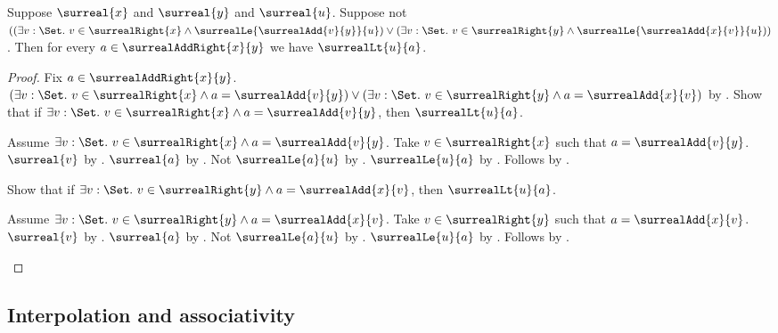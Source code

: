 \begin{lemma}\label{surreal_add_right_above_without_interpolant}
    Suppose $\surreal{x}$ and $\surreal{y}$ and $\surreal{u}$.
    Suppose not $((\exists v:\Set.\ v\in\surrealRight{x}\land
            \surrealLe{\surrealAdd{v}{y}}{u})
        \lor(\exists v:\Set.\ v\in\surrealRight{y}\land
            \surrealLe{\surrealAdd{x}{v}}{u}))$.
    Then for every $a\in\surrealAddRight{x}{y}$ we have
        $\surrealLt{u}{a}$.
\end{lemma}
\begin{proof}
    Fix $a\in\surrealAddRight{x}{y}$.
    $(\exists v:\Set.\ v\in\surrealRight{x}\land
            a=\surrealAdd{v}{y})
        \lor
        (\exists v:\Set.\ v\in\surrealRight{y}\land
            a=\surrealAdd{x}{v})$
        by .
    Show that if $\exists v:\Set.\ v\in\surrealRight{x}\land
            a=\surrealAdd{v}{y}$, then $\surrealLt{u}{a}$.
    \begin{subproof}
        Assume $\exists v:\Set.\ v\in\surrealRight{x}\land
            a=\surrealAdd{v}{y}$.
        Take $v\in\surrealRight{x}$ such that
            $a=\surrealAdd{v}{y}$.
        $\surreal{v}$ by .
        $\surreal{a}$ by .
        Not $\surrealLe{a}{u}$ by \auto.
        $\surrealLe{u}{a}$
            by .
        Follows by .
    \end{subproof}
    Show that if $\exists v:\Set.\ v\in\surrealRight{y}\land
            a=\surrealAdd{x}{v}$, then $\surrealLt{u}{a}$.
    \begin{subproof}
        Assume $\exists v:\Set.\ v\in\surrealRight{y}\land
            a=\surrealAdd{x}{v}$.
        Take $v\in\surrealRight{y}$ such that
            $a=\surrealAdd{x}{v}$.
        $\surreal{v}$ by .
        $\surreal{a}$ by .
        Not $\surrealLe{a}{u}$ by \auto.
        $\surrealLe{u}{a}$
            by .
        Follows by .
    \end{subproof}
\end{proof}

\subsection{Interpolation and associativity}

